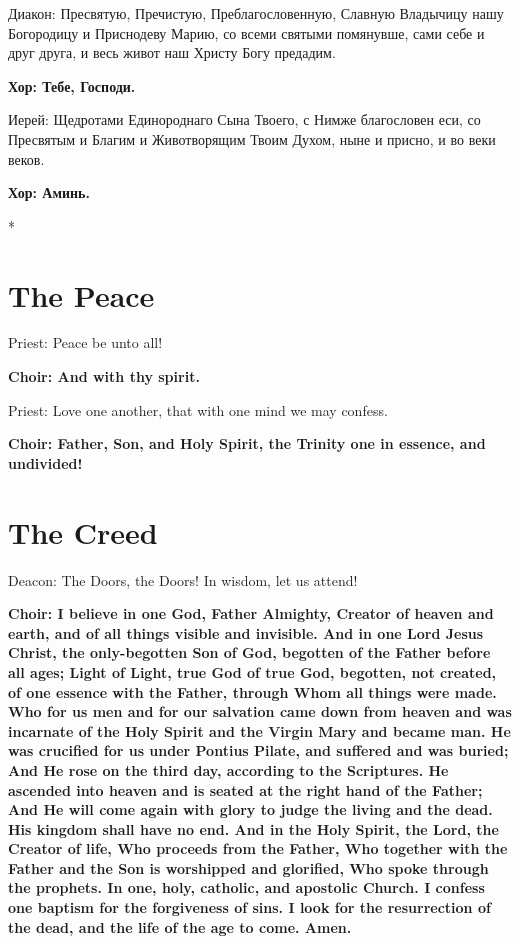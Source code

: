 \documentclass[12pt,a4paper,titlepage]{report}
\begin{document}
\begin{paracol}[1]{2}
	Диакон: Пресвятую, Пречистую, Преблагословенную, Славную Владычицу нашу Богородицу и Приснодеву Марию, со всеми святыми помянувше, сами себе и друг друга, и весь живот наш Христу Богу предадим.
	
	\textbf{Хор: Тебе, Господи.}
	
	Иерей: Щедротами Единороднаго Сына Твоего, с Нимже благословен еси, со Пресвятым и Благим и Животворящим Твоим Духом, ныне и присно, и во веки веков.
	
	\textbf{Хор: Аминь.}
	
	\switchcolumn[0]*
	
	\section*{The Peace}
	
	Priest: Peace be unto all!
	
	\textbf{Choir: And with thy spirit.}
	
	Priest: Love one another, that with one mind we may confess.
	
	\textbf{Choir: Father, Son, and Holy Spirit, the Trinity one in essence, and undivided!}
	
	\section*{The Creed}
	
	Deacon: The Doors, the Doors! In wisdom, let us attend!
	
	\textbf{Choir: I believe in one God, Father Almighty, Creator of heaven and earth, and of all things visible and invisible. And in one Lord Jesus Christ, the only-begotten Son of God, begotten of the Father before all ages; Light of Light, true God of true God, begotten, not created, of one essence with the Father, through Whom all things were made. Who for us men and for our salvation came down from heaven and was incarnate of the Holy Spirit and the Virgin Mary and became man. He was crucified for us under Pontius Pilate, and suffered and was buried; And He rose on the third day, according to the Scriptures. He ascended into heaven and is seated at the right hand of the Father; And He will come again with glory to judge the living and the dead. His kingdom shall have no end. And in the Holy Spirit, the Lord, the Creator of life, Who proceeds from the Father, Who together with the Father and the Son is worshipped and glorified, Who spoke through the prophets. In one, holy, catholic, and apostolic Church. I confess one baptism for the forgiveness of sins. I look for the resurrection of the dead, and the life of the age to come. Amen.}
	

\end{paracol}
\end{document}
